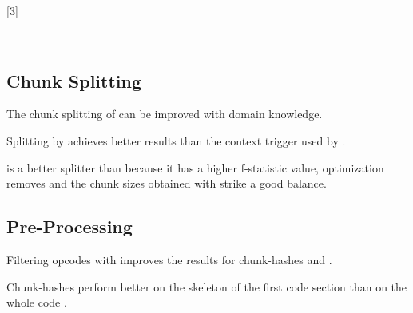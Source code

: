 \documentclass[../main.tex]{subfiles}
\begin{document}
[3]{
  \begin{table}[ht!]
    \centering
    \scriptsize %
    \parbox{5em}{~}
    \BODY
  \end{table}
}

\subsection{Chunk Splitting}
\begin{hyp}
  The chunk splitting of  can be improved with domain knowledge.
\end{hyp}
\begin{res}
  Splitting by  achieves better results than the context trigger used by .
\end{res}
\begin{res}
   is a better splitter than  because it has a higher f-statistic value, optimization removes  and the chunk sizes obtained with  strike a good balance.
\end{res}

\begin{figure}[ht!]
  \centering
  \caption{\n{\solcts}  }
  \label{fig:jumpPpVio}
\end{figure}

\subsection{Pre-Processing}
\begin{res}
  Filtering opcodes with  improves the results for chunk-hashes and .
\end{res}
\begin{res}
  Chunk-hashes perform better on the skeleton of the first code section than on the whole code .
\end{res}
\end{document}

